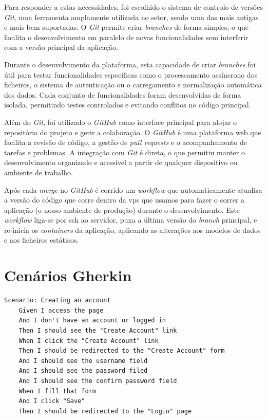 Para responder a estas necessidades, foi escolhido o sistema de controlo de versões \textit{Git}, uma ferramenta amplamente utilizada no setor, sendo uma das mais antigas e mais bem suportadas. O \textit{Git} permite criar \textit{branches} de forma simples, o que facilita o desenvolvimento em paralelo de novas funcionalidades sem interferir com a versão principal da aplicação.

Durante o desenvolvimento da plataforma, esta capacidade de criar \textit{branches} foi útil para testar funcionalidades específicas como o processamento assíncrono dos ficheiros, o sistema de autenticação ou o carregamento e normalização automática dos dados. Cada conjunto de funcionalidades foram desenvolvidas de forma isolada, permitindo testes controlados e evitando conflitos no código principal.

Além do \textit{Git}, foi utilizado o \textit{GitHub} como interface principal para alojar o repositório do projeto e gerir a colaboração. O \textit{GitHub} é uma plataforma web que facilita a revisão de código, a gestão de \textit{pull requests} e o acompanhamento de tarefas e problemas. A integração com \textit{Git} é direta, o que permitiu manter o desenvolvimento organizado e acessível a partir de qualquer dispositivo ou ambiente de trabalho.

Após cada \textit{merge} no \textit{GitHub} é corrido um \textit{workflow} que automaticamente atualiza a versão do código que corre dentro da \gls{vps} que usamos para fazer o correr a aplicação (o nosso ambiente de produção) durante o desenvolvimento. Este \textit{workflow} liga-se por \gls{ssh} ao servidor, puxa a última versão do \textit{branch} principal, e re-inicia os \textit{containers} da aplicação, aplicando as alterações aos modelos de dados e aos ficheiros estáticos.

\chapter{Cenários Gherkin}
\label{ch:cenariosGherkin}

\begin{verbatim}
Scenario: Creating an account
    Given I access the page 
    And I don't have an account or logged in
    Then I should see the "Create Account" link
    When I click the "Create Account" link
    Then I should be redirected to the "Create Account" form
    And I should see the username field
    And I should see the password filed
    And I should see the confirm password field
    When I fill that form
    And I click "Save"
    Then I should be redirected to the "Login" page
\end{verbatim}



